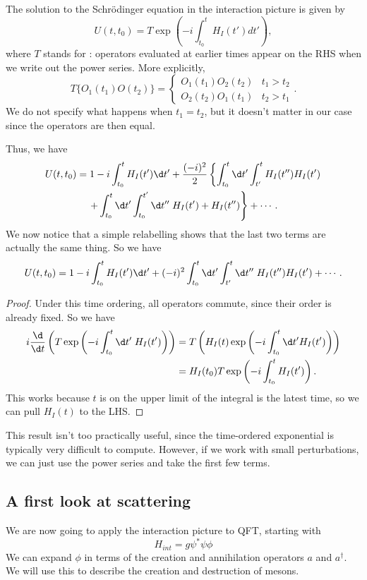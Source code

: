 \documentclass[a4paper]{article}
\begin{document}
\begin{prop}
  The solution to the Schr\"odinger equation in the interaction picture is given by
  \[
    U(t, t_0) = T\exp\left(-i \int_{t_0}^t H_I(t') dt'\right),
  \]
  where $T$ stands for : operators evaluated at earlier times appear on the RHS when we write out the power series. More explicitly,
  \[
    T\{O_1(t_1) O(t_2)\} =
    \begin{cases}
      O_1(t_1) O_2(t_2) & t_1 > t_2\\
      O_2(t_2) O_1(t_1) & t_2 > t_1
    \end{cases}.
  \]
  We do not specify what happens when $t_1 = t_2$, but it doesn't matter in our case since the operators are then equal.

  Thus, we have
  \begin{multline*}
    U(t, t_0) = 1 - i \int_{t_0}^t H_I (t') \d t' + \frac{(-i)^2}{2} \left\{\int_{t_0}^t \d t' \int_{t'}^t H_I(t'') H_I(t')\right.\\
    \left.+ \int_{t_0}^t \d t' \int_{t_0}^{t'} \d t''\; H_I(t') + H_I(t'')\right\} + \cdots.
  \end{multline*}
  We now notice that a simple relabelling shows that the last two terms are actually the same thing. So we have
  \[
    U(t, t_0) = 1 - i \int_{t_0}^t H_I (t') \d t' + (-i)^2 \int_{t_0}^t \d t' \int_{t'}^t \d t'' \; H_I(t'') H_I(t') + \cdots.
  \]
\end{prop}

\begin{proof}
  Under this time ordering, all operators commute, since their order is already fixed. So we have
  \begin{align*}
    i\frac{\d}{\d t}\left(T\exp\left(-i \int_{t_0}^t \d t'\; H_I (t')\right)\right) &= T\left(H_I(t) \exp\left(-i \int_{t_0}^t \d t' H_I(t')\right)\right)\\
    &= H_I(t_0) T \exp\left(-i \int_{t_0}^t H_I(t')\right).
  \end{align*}
  This works because $t$ is on the upper limit of the integral is the latest time, so we can pull $H_I(t)$ to the LHS.
\end{proof}
This result isn't too practically useful, since the time-ordered exponential is typically very difficult to compute. However, if we work with small perturbations, we can just use the power series and take the first few terms.

\subsection{A first look at scattering}
We are now going to apply the interaction picture to QFT, starting with
\[
  H_{int} = g\psi^* \psi \phi
\]
We can expand $\phi$ in terms of the creation and annihilation operators $a$ and $a^\dagger$. We will use this to describe the creation and destruction of mesons.
\end{document}
